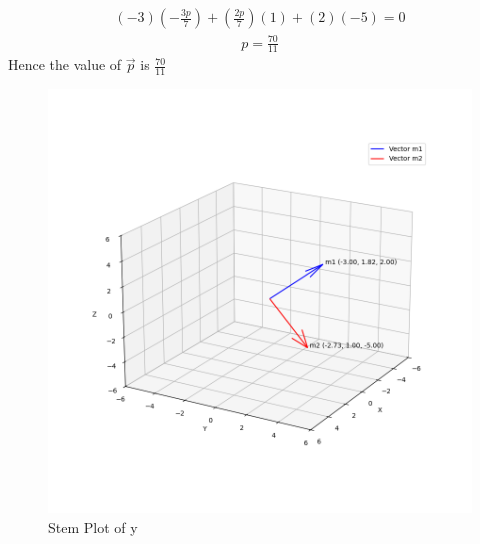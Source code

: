 \documentclass[journal]{IEEEtran}
\begin{document}
\begin{align}
(-3)(-\frac{3p}{7}) + (\frac{2p}{7})(1) + (2)(-5) = 0
\end{align}
\begin{align}
p = \frac{70}{11}
\end{align}
Hence the value of $\vec{p}$ is $\frac{70}{11}$
\begin{figure}[h!]
   \centering
   \includegraphics[width=0.7\columnwidth]{figs/fig1.png}
   \caption{Stem Plot of y}
   \label{stemplot}
\end{figure}
\end{document}
